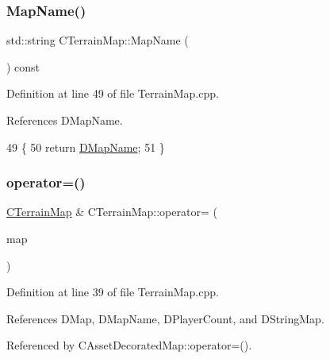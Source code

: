 \subsubsection{\texorpdfstring{Map\+Name()}{MapName()}}
{\footnotesize\ttfamily std\+::string C\+Terrain\+Map\+::\+Map\+Name (\begin{DoxyParamCaption}{ }\end{DoxyParamCaption}) const}



Definition at line 49 of file Terrain\+Map.\+cpp.



References D\+Map\+Name.


\begin{DoxyCode}
49                                     \{
50     \textcolor{keywordflow}{return} \hyperlink{classCTerrainMap_a9026e4a5f073885b9e9fc3b43e93caa6}{DMapName};   
51 \}
\end{DoxyCode}
\hypertarget{classCTerrainMap_ad9f476d5d4db6de2907dfa3d4d9de7e6}{}\label{classCTerrainMap_ad9f476d5d4db6de2907dfa3d4d9de7e6} 
\subsubsection{\texorpdfstring{operator=()}{operator=()}}
{\footnotesize\ttfamily \hyperlink{classCTerrainMap}{C\+Terrain\+Map} \& C\+Terrain\+Map\+::operator= (\begin{DoxyParamCaption}\item[{const \hyperlink{classCTerrainMap}{C\+Terrain\+Map} \&}]{map }\end{DoxyParamCaption})}



Definition at line 39 of file Terrain\+Map.\+cpp.



References D\+Map, D\+Map\+Name, D\+Player\+Count, and D\+String\+Map.



Referenced by C\+Asset\+Decorated\+Map\+::operator=().


